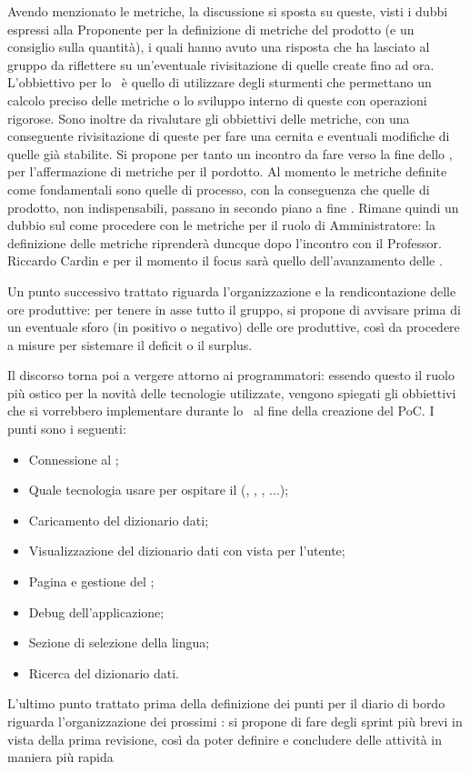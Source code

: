 \par Avendo menzionato le metriche, la discussione si sposta su queste, visti i dubbi espressi alla Proponente per la definizione di metriche del prodotto (e un consiglio sulla quantità), i quali hanno avuto una risposta che ha lasciato al gruppo da riflettere su un'eventuale rivisitazione di quelle create fino ad ora. 
L'obbiettivo per lo \ è quello di utilizzare degli sturmenti che permettano un calcolo preciso delle metriche o lo sviluppo interno di queste con operazioni rigorose. 
Sono inoltre da rivalutare gli obbiettivi delle metriche, con una conseguente rivisitazione di queste per fare una cernita e eventuali modifiche di quelle già stabilite.
Si propone per tanto un incontro da fare verso la fine dello , per l'affermazione di metriche per il pordotto.
Al momento le metriche definite come fondamentali sono quelle di processo, con la conseguenza che quelle di prodotto, non indispensabili, passano in secondo piano a fine .
Rimane quindi un dubbio sul come procedere con le metriche per il ruolo di Amministratore: la definizione delle metriche riprenderà duncque dopo l'incontro con il Professor. Riccardo Cardin e per il momento il focus sarà quello dell'avanzamento delle \NdP.
\par Un punto successivo trattato riguarda l'organizzazione e la rendicontazione delle ore produttive: per tenere in asse tutto il gruppo, si propone di avvisare prima di un eventuale sforo (in positivo o negativo) delle ore produttive, così da procedere a misure per sistemare il deficit o il surplus.
\par Il discorso torna poi a vergere attorno ai programmatori: essendo questo il ruolo più ostico per la novità delle tecnologie utilizzate, vengono spiegati gli obbiettivi che si vorrebbero implementare durante lo \ al fine della creazione del PoC. I punti sono i seguenti:
\begin{itemize}
	\item Connessione al ;
	\item Quale tecnologia usare per ospitare il  (, , , ...);
	\item Caricamento del dizionario dati;
	\item Visualizzazione del dizionario dati con vista per l'utente;
	\item Pagina e gestione del ; 
	\item Debug dell'applicazione;
	\item Sezione di selezione della lingua;
	\item Ricerca del dizionario dati.
\end{itemize}
\par L'ultimo punto trattato prima della definizione dei punti per il diario di bordo riguarda l'organizzazione dei prossimi : si propone di fare degli sprint più brevi in vista della prima revisione, così da poter definire e concludere delle attività in maniera più rapida
